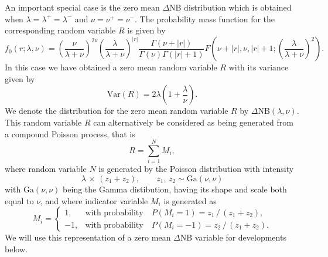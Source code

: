 \documentclass[12pt]{article}
\begin{document}
An important special case 
is the zero mean $\Delta$NB distribution which
is obtained when $\lambda=\lambda^{+}= \lambda^{-}$ and $\nu=\nu^{+}= \nu^{-}$.
The probability mass function for the corresponding random variable
$R$ is given by
\begin{equation*}
f_0(r; \lambda, \nu )=\left(\frac{\nu}{ \lambda+\nu}\right)^{2\nu}\left(\frac{\lambda}{ \lambda+\nu}\right)^{|r|} \frac{\Gamma(\nu+|r|) }{\Gamma(\nu)\Gamma(|r|+1)} F\left(\nu+|r|, \nu, |r|+1; \left(\frac{\lambda}{ \lambda+\nu}\right)^2\right) .
\end{equation*}
In this case we have obtained a zero mean random variable $R$ with
its variance given by
\begin{equation}
\textrm{Var}(R)= 2\lambda \left(1+\frac{\lambda}{\nu}\right).
\end{equation}
We denote the distribution for the zero mean random variable $R$ by
$\Delta$NB$(\lambda, \nu)$. This random variable $R$ can alternatively be
considered as being generated from a compound Poisson process, that is
\begin{equation}
R=\sum \limits_{i=1}^{N} M_i ,
\end{equation}
where random variable $N$ is generated by
the Poisson distribution with intensity 
\begin{equation}
\lambda \, \times \, (z_1 + z_2) , \qquad z_1,\, z_2 \sim \text{Ga}(\nu,\nu) 
\label{c_eq:gammapo}
\end{equation}
with $\text{Ga}(\nu,\nu)$ being the Gamma distibution, having its shape and
scale both equal to $\nu$,
and where indicator variable $M_i$ is generated as
\begin{equation}
M_i =
\begin{cases}
 1, & \text{with probability} \quad P(M_i =  1)= z_1 \, / \, (z_1 + z_2), \\
-1, & \text{with probability} \quad P(M_i = -1)= z_2 \, / \, (z_1 + z_2).
\end{cases}
\end{equation}
We will use this representation of a zero mean $\Delta$NB variable
for developments below.
\end{document}
